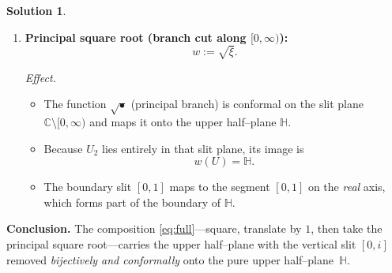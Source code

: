 \documentclass[12pt]{article}
\theoremstyle{definition} %
\newtheorem{solution}{Solution}
\theoremstyle{plain} %
\begin{document}
\begin{solution}
\begin{enumerate}[label=\textbf{Step~\arabic*.},wide,labelwidth=!,labelindent=0pt]
  \item \textbf{Principal square root (branch cut along \([0,\infty)\)):}
        \[
           w := \sqrt{\xi}.
        \]
  
        \emph{Effect.}
        \begin{itemize}
          \item The function $\sqrt{\bullet}$ (principal branch) is
                conformal on the slit plane
                $\mathbb{C}\setminus[0,\infty)$ and maps it onto
                the upper half–plane $\mathbb{H}$.
          \item Because $U_2$ lies entirely in that slit plane, its image
                is
                \[
                   w(U)
                   = \mathbb{H}.
                \]
          \item The boundary slit \([0,1]\) maps to the segment
                \([0,1]\) on the \emph{real} axis, which forms part of
                the boundary of $\mathbb{H}$.
        \end{itemize}
  
  \end{enumerate}
  
  \bigskip
  \textbf{Conclusion.}
  The composition \eqref{eq:full}—square, translate by \(1\),
  then take the principal square root—carries the upper half–plane
  with the vertical slit \([0,i]\) removed \emph{bijectively and
  conformally} onto the pure upper half–plane~\(\mathbb{H}\).
  
  \end{solution}
\end{document}
